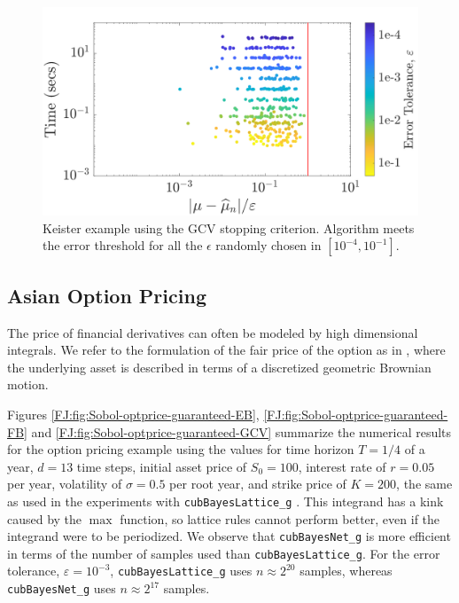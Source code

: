 \documentclass[graybox,footinfo]{svmult}
\begin{document}
\begin{figure}
\centering
\includegraphics[width=0.95\linewidth]{"figures/Sobol/Sobol_Keister_guaranteed_time_GCV__d4_r1_2019-Sep-1"}
\caption[Sobol: Keister guaranteed: GCV]{Keister example using the GCV stopping criterion. Algorithm meets the error threshold for all the $\epsilon$ randomly chosen in $[10^{-4}, 10^{-1}]$.}
\label{FJ:fig:Sobol-keister-guaranteed-GCV}
\end{figure}







\subsection{Asian Option Pricing}

The price of financial derivatives can often be modeled by high dimensional integrals. 
We refer to the formulation of the fair price of the option as in \cite{RatHic19a}, where the underlying asset is described in terms of a discretized geometric Brownian motion.


Figures \ref{FJ:fig:Sobol-optprice-guaranteed-EB}, \ref{FJ:fig:Sobol-optprice-guaranteed-FB} and 
\ref{FJ:fig:Sobol-optprice-guaranteed-GCV} summarize the numerical results for the option pricing example using the values for
time horizon $T = 1/4$ of a year, $d = 13$ time steps, initial asset price of $S_0 = 100$, interest rate of $r =  0.05$ per year, volatility of $\sigma = 0.5$ per root year, and strike price of  $K = 200$, the same as used in the experiments with \texttt{cubBayesLattice\_g} \cite{RatHic19a}.
This integrand has a kink caused by the $\max$ function, so lattice rules cannot perform better, even if the integrand were to be periodized.  We observe that \texttt{cubBayesNet\_g} is more efficient in terms of the number of samples used than \texttt{cubBayesLattice\_g}.  For the error tolerance, $\varepsilon=10^{-3}$,  \texttt{cubBayesLattice\_g} uses $n \approx 2^{20}$ samples, whereas \texttt{cubBayesNet\_g} uses $n \approx 2^{17}$ samples.
\end{document}
